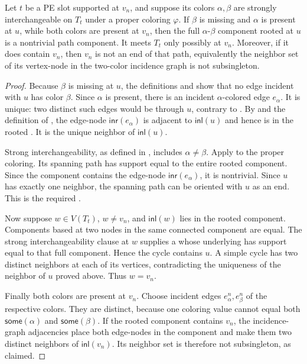 \begin{helper}
Let \(t\) be a PE slot supported at \(v_n\), and suppose its colors
\(\alpha,\beta\) are strongly interchangeable on \(T_t\) under a proper
coloring \(\varphi\).  If \(\beta\) is missing and \(\alpha\) is present at
\(u\), while both colors are present at \(v_n\), then the full
\(\alpha\)-\(\beta\) component rooted at \(u\) is a nontrivial path
component.  It meets \(T_t\) only possibly at \(v_n\).  Moreover, if it
does contain \(v_n\), then \(v_n\) is not an end of that path, equivalently
the neighbor set of its vertex-node in the two-color incidence graph is not
subsingleton.
\end{helper}
\begin{proof}
Because \(\beta\) is missing at \(u\), the definitions
 and  show that no edge
incident with \(u\) has color \(\beta\).  Since \(\alpha\) is present,
there is an incident \(\alpha\)-colored edge \(e_\alpha\).  It is unique:
two distinct such edges would be  through \(u\),
contrary to .  By  and
the definition of , the edge-node
\(\mathsf{inr}(e_\alpha)\) is adjacent to \(\mathsf{inl}(u)\) and hence is
in the rooted .  It is the unique neighbor of
\(\mathsf{inl}(u)\).

Strong interchangeability, as defined in
, includes \(\alpha\ne\beta\).
Apply  to the proper coloring.
Its spanning path has support equal to the entire rooted component.  Since
the component contains the edge-node \(\mathsf{inr}(e_\alpha)\), it is
nontrivial.  Since \(u\) has exactly one neighbor, the spanning path can be
oriented with \(u\) as an end.  This is the required
.

Now suppose \(w\in V(T_t)\), \(w\ne v_n\), and
\(\mathsf{inl}(w)\) lies in the rooted component.  Components based at two
nodes in the same connected component are equal.  The strong
interchangeability clause at \(w\) supplies a
 whose underlying
 has support equal to that full component.  Hence
the cycle contains \(u\).  A simple cycle has two distinct neighbors at
each of its vertices, contradicting the uniqueness of the neighbor of
\(u\) proved above.  Thus \(w=v_n\).

Finally both colors are present at \(v_n\).  Choose incident edges
\(e_\alpha^n,e_\beta^n\) of the respective colors.  They are distinct,
because one coloring value cannot equal both \(\mathsf{some}(\alpha)\)
and \(\mathsf{some}(\beta)\).  If the rooted component contains \(v_n\),
the incidence-graph adjacencies place both edge-nodes in the component and
make them two distinct neighbors of \(\mathsf{inl}(v_n)\).  Its neighbor
set is therefore not subsingleton, as claimed.
\end{proof}
